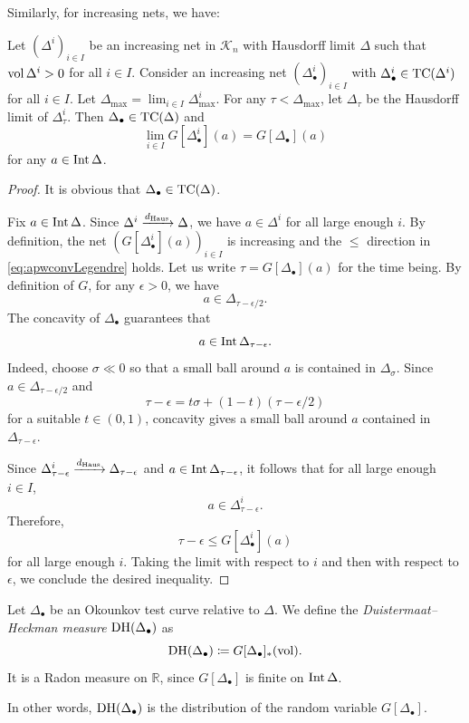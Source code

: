 Similarly, for increasing nets, we have:
\begin{proposition}\label{prop:incnetLegend}
    Let $(\Delta^i)_{i\in I}$ be an increasing net in $\mathcal{K}_n$ with Hausdorff limit $\Delta$ such that $\operatorname{vol} \Delta^i>0$ for all $i\in I$. Consider an increasing net $(\Delta^i_{\bullet})_{i\in I}$ with $\Delta^i_{\bullet}\in \mathrm{TC}(\Delta^i)$ for all $i\in I$.
    Let $\Delta_{\max}=\lim_{i\in I}\Delta^i_{\max}$. For any $\tau<\Delta_{\max}$, let $\Delta_{\tau}$ be the Hausdorff limit of $\Delta^i_{\tau}$. Then $\Delta_{\bullet}\in \mathrm{TC}(\Delta)$ and
    \begin{equation}\label{eq:apwconvLegendre}
    \lim_{i\in I}G[\Delta^i_{\bullet}](a)=G[\Delta_{\bullet}](a)
    \end{equation}
    for any $a\in \operatorname{Int} \Delta$.
\end{proposition}
\begin{proof}
    It is obvious that $\Delta_{\bullet}\in \mathrm{TC}(\Delta)$.

    Fix $a\in \operatorname{Int} \Delta$. Since $\Delta^i\xrightarrow{d_{\mathrm{Haus}}}\Delta$, we have $a\in \Delta^i$ for all large enough $i$.
    By definition, the net $(G[\Delta^i_{\bullet}](a))_{i\in I}$ is increasing and the $\leq$ direction in \eqref{eq:apwconvLegendre} holds.
    Let us write $\tau=G[\Delta_{\bullet}](a)$ for the time being.
    By definition of $G$, for any $\epsilon>0$, we have
    \[
    a\in \Delta_{\tau-\epsilon/2}.
    \]
    The concavity of $\Delta_{\bullet}$ guarantees that
    \[
    a\in \operatorname{Int} \Delta_{\tau-\epsilon}.
    \]
    Indeed, choose $\sigma\ll 0$ so that a small ball around $a$ is contained in $\Delta_\sigma$. Since $a\in\Delta_{\tau-\epsilon/2}$ and
    \[
        \tau-\epsilon=t\sigma+(1-t)(\tau-\epsilon/2)
    \]
    for a suitable $t\in(0,1)$, concavity gives a small ball around $a$ contained in $\Delta_{\tau-\epsilon}$.


    Since $\Delta^i_{\tau-\epsilon}\xrightarrow{d_{\mathrm{Haus}}}\Delta_{\tau-\epsilon}$ and $a\in \operatorname{Int} \Delta_{\tau-\epsilon}$, it follows that for all large enough $i\in I$,
    \[
    a\in \Delta^i_{\tau-\epsilon}.
    \]
    Therefore,
    \[
    \tau-\epsilon\leq G[\Delta^i_{\bullet}](a)
    \]
    for all large enough $i$. Taking the limit with respect to $i$ and then with respect to $\epsilon$, we conclude the desired inequality.
\end{proof}

\begin{definition}\label{def:DHmeasureOTC}
	Let $\Delta_{\bullet}$ be an Okounkov test curve relative to $\Delta$. We define the \emph{Duistermaat--Heckman measure} $\DHm(\Delta_{\bullet})$\index{$\DHm(\Delta_{\bullet})$} as
	\[
		\operatorname{DH}(\Delta_{\bullet})\coloneqq G[\Delta_{\bullet}]_*(\operatorname{vol}).
	\]
	It is a Radon measure on $\mathbb{R}$, since $G[\Delta_{\bullet}]$ is finite on $\operatorname{Int} \Delta$.
\end{definition}
In other words, $\DHm(\Delta_{\bullet})$ is the distribution of the random variable $G[\Delta_{\bullet}]$.

